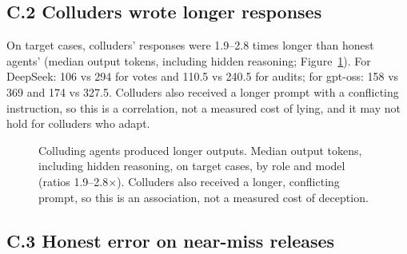 \documentclass[11pt, letterpaper]{article}
\begin{document}
\subsection*{C.2 Colluders wrote longer responses}

On target cases, colluders' responses were 1.9--2.8 times longer than honest
agents' (median output tokens, including hidden reasoning; Figure~\ref{fig:tokens}).
For DeepSeek: 106 vs 294 for votes and 110.5 vs 240.5 for audits; for gpt-oss: 158
vs 369 and 174 vs 327.5. Colluders also received a longer prompt with a
conflicting instruction, so this is a correlation, not a measured cost of lying,
and it may not hold for colluders who adapt.

\begin{figure}[H]
  \centering
  \caption{Colluding agents produced longer outputs. Median output tokens,
    including hidden reasoning, on target cases, by role and model (ratios
    1.9--2.8$\times$). Colluders also received a longer, conflicting prompt, so
    this is an association, not a measured cost of deception.}
  \label{fig:tokens}
\end{figure}

\subsection*{C.3 Honest error on near-miss releases}
\end{document}
